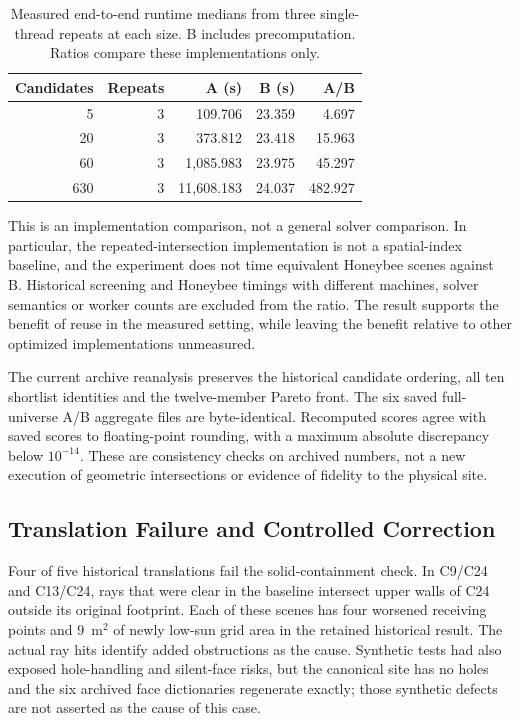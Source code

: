 \documentclass{llncs}
\begin{document}
\begin{table}[tbp]
\caption{Measured end-to-end runtime medians from three single-thread repeats at each size. B includes precomputation. Ratios compare these implementations only.}
\label{tab:runtime}\centering
\begin{tabular}{rrrrr}\toprule
Candidates & Repeats & A (s) & B (s) & A/B\\\midrule
5 & 3 & 109.706 & 23.359 & 4.697\\
20 & 3 & 373.812 & 23.418 & 15.963\\
60 & 3 & 1,085.983 & 23.975 & 45.297\\
630 & 3 & 11,608.183 & 24.037 & 482.927\\\bottomrule
\end{tabular}
\end{table}

This is an implementation comparison, not a general solver comparison. In particular, the repeated-intersection implementation is not a spatial-index baseline, and the experiment does not time equivalent Honeybee scenes against B. Historical screening and Honeybee timings with different machines, solver semantics or worker counts are excluded from the ratio. The result supports the benefit of reuse in the measured setting, while leaving the benefit relative to other optimized implementations unmeasured.

The current archive reanalysis preserves the historical candidate ordering, all ten shortlist identities and the twelve-member Pareto front. The six saved full-universe A/B aggregate files are byte-identical. Recomputed scores agree with saved scores to floating-point rounding, with a maximum absolute discrepancy below $10^{-14}$. These are consistency checks on archived numbers, not a new execution of geometric intersections or evidence of fidelity to the physical site.

\subsection{Translation Failure and Controlled Correction}
Four of five historical translations fail the solid-containment check. In C9/C24 and C13/C24, rays that were clear in the baseline intersect upper walls of C24 outside its original footprint. Each of these scenes has four worsened receiving points and 9~m$^2$ of newly low-sun grid area in the retained historical result. The actual ray hits identify added obstructions as the cause. Synthetic tests had also exposed hole-handling and silent-face risks, but the canonical site has no holes and the six archived face dictionaries regenerate exactly; those synthetic defects are not asserted as the cause of this case.
\end{document}
